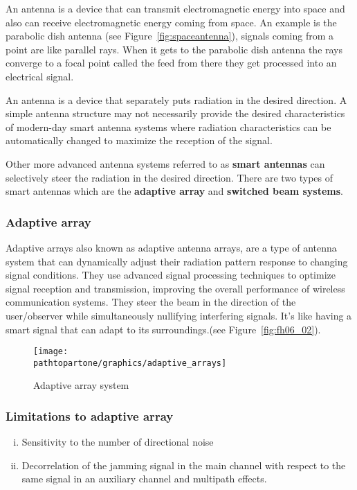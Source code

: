 An antenna is a device that can transmit electromagnetic energy into space and also can receive electromagnetic energy coming from space. An example is the parabolic dish antenna (see Figure~\ref{fig:spaceantenna}), signals coming from a point are like parallel rays. When it gets to the parabolic dish antenna the rays converge to a focal point called the feed from there they get processed into an electrical signal.

An antenna is a device that separately puts radiation in the desired direction. A simple antenna structure may not necessarily provide the desired characteristics of modern-day smart antenna systems where radiation characteristics can be automatically changed to maximize the reception of the signal.

Other more advanced antenna systems referred to as \textbf{smart antennas} can selectively steer the radiation in the desired direction. There are two types of smart antennas which are the \textbf{adaptive array} and \textbf{switched beam systems}.

\subsubsection{Adaptive array}
Adaptive arrays also known as adaptive antenna arrays, are a type of antenna system that can dynamically adjust their radiation pattern response to changing signal conditions. They use advanced signal processing techniques to optimize signal reception and transmission, improving the overall performance of wireless communication systems.\newline
They steer the beam in the direction of the user/observer while simultaneously nullifying interfering signals. It’s like having a smart signal that can adapt to its surroundings.(see Figure~\ref{fig:fh06_02}).
\begin{figure}[h]
\centering
\texttt{[image: \\pathtopartone/graphics/adaptive\_arrays]}
\caption{Adaptive array system}
\label{fig:adaptive_arrays}
\end{figure}

\subsubsection{Limitations to adaptive array}
\begin{enumerate}[(i)]
\item Sensitivity to the number of directional noise
\item Decorrelation of the jamming signal in the main channel with respect to the same signal in an auxiliary channel and multipath effects.
\end{enumerate}

